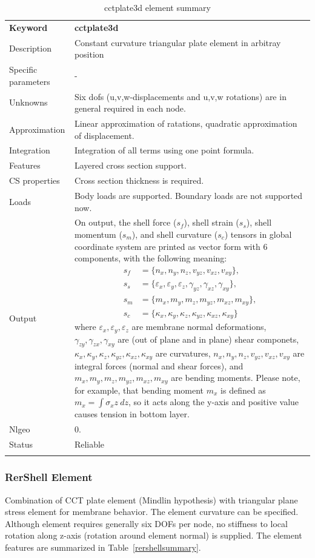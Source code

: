 \documentclass[a4paper]{article}
\newcommand{\param}[1]{\texttt{#1}} %
\newcommand{\templabel}{}%
\newcommand{\tempcaption}{}%
\newcounter{nelpar}
\newenvironment{elementsummary}[5]{%
  \gdef\tempcaption{#4}%
  \gdef\templabel{#5}%
  \setcounter{nelpar}{0}%
  \begin{center} %
    \begin{table}[!htb] %
      \begin{tabular}{|l|p{9cm}|}\hline %
        {\bf Keyword} & \bf{#1}\\ %
        {Description} & {#2}\\ %
        {Specific parameters} & {#3}\\ \hline %
}{
  \\ \hline %
      \end{tabular}%
      \caption{\tempcaption}%
      \label{\templabel}%
    \end{table}%
  \end{center}%
}
\newcommand{\elementParam}[1]{%
  \ifthenelse{\value{nelpar}>0} %
             {&{#1}}%
             {\setcounter{nelpar}{1}Parameters&{#1}}%
             \\%
}
\newcommand{\elementDescription}[2]{{#1} & {#2}\\}
\begin{document}
\begin{elementsummary}{cctplate3d}{Constant curvature triangular plate element in arbitray position}{-}{cctplate3d element summary}{cctplate3dsummary}
\elementDescription{Unknowns}{Six dofs (u,v,w-displacements and u,v,w rotations) are in general required in each node.}
\elementDescription{Approximation}{Linear approximation of ratations, quadratic approximation of displacement.}
\elementDescription{Integration}{Integration of all terms using one point formula.}
\elementDescription{Features}{Layered cross section support.}
\elementDescription{CS properties}{Cross section thickness is required.}
\elementDescription{Loads}{Body loads are supported. Boundary loads are not supported now.}
\elementDescription{Output}{On output, the shell force ($s_f$), shell strain ($s_s$), shell momentum ($s_m$), and shell curvature ($s_c$) tensors in global coordinate system are printed as vector form with 6 components, with the following meaning:
\begin{align*}
s_f &=\{n_x, n_y, n_z, v_{yz}, v_{xz}, v_{xy}\},\\
s_s &=\{\varepsilon_x, \varepsilon_y, \varepsilon_z, \gamma_{yz}, \gamma_{xz}, \gamma_{xy}\},\\
s_m &=\{m_x, m_y, m_z, m_{yz}, m_{xz}, m_{xy}\},\\
s_c &=\{\kappa_x, \kappa_y, \kappa_z, \kappa_{yz}, \kappa_{xz}, \kappa_{xy}\}
\end{align*}
where $\varepsilon_x, \varepsilon_y, \varepsilon_z$ are membrane normal deformations, $\gamma_{zy}, \gamma_{zx}, \gamma_{xy}$ are (out of plane and in plane) shear componets, $\kappa_x, \kappa_y, \kappa_z, \kappa_{yz}, \kappa_{xz}, \kappa_{xy}$ are curvatures, $n_x, n_y, n_z, v_{yz}, v_{xz}, v_{xy}$ are integral forces (normal and shear forces), and $m_x, m_y, m_z, m_{yz}, m_{xz}, m_{xy}$ are bending moments. 
Please note, for example, that bending moment $m_x$ is defined as $m_x=\int \sigma_x z\ dz$, so it acts along the y-axis and positive value causes tension in bottom layer.}
\elementDescription{Nlgeo}{0.}
\elementDescription{Status}{Reliable}
\end{elementsummary}


\subsubsection {RerShell Element}
Combination of CCT plate element (Mindlin hypothesis) with triangular plane stress element
for membrane behavior. The element curvature can be specified. 
Although element requires generally six DOFs per node, no stiffness to
local rotation along z-axis (rotation around element normal) is supplied. 
The element features are summarized in Table~\ref{rershellsummary}.
\end{document}
